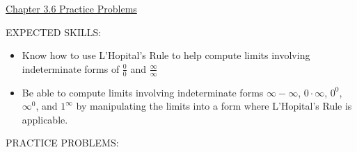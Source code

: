 \documentclass[12pt]{article}
\begin{document}
\begin{center}
\underline{\LARGE{Chapter 3.6 Practice Problems}}
\end{center}

\noindent EXPECTED SKILLS:

\begin{itemize}

\item Know how to use L'Hopital's Rule to help compute limits involving indeterminate forms of $\frac{0}{0}$ and $\frac{\infty}{\infty}$

\item Be able to compute limits involving indeterminate forms $\infty-\infty$, $0 \cdot \infty$, $0^0$, $\infty^0$, and $1^{\infty}$ by manipulating the limits into a form where L'Hopital's Rule is applicable.

\end{itemize}

\noindent PRACTICE PROBLEMS:

\medskip

\end{document}
